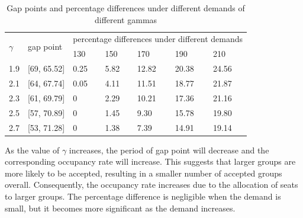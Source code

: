 \begin{table}[ht]
  \centering
  \caption{Gap points and percentage differences under different demands of different gammas}
\begin{tabular}{lllllll}
  \hline
  \multicolumn{1}{|l|}{\multirow{2}{*}{$\gamma$}} & \multicolumn{1}{l|}{\multirow{2}{*}{gap point}} & \multicolumn{5}{l|}{percentage differences under different demands}   \\ 
  \cline{3-7} 
  \multicolumn{1}{|l|}{}                      & \multicolumn{1}{l|}{}                    & \multicolumn{1}{l|}{130} & \multicolumn{1}{l|}{150} & \multicolumn{1}{l|}{170} & \multicolumn{1}{l|}{190} & \multicolumn{1}{l|}{210} \\ 
  \hline
  \multicolumn{1}{|l|}{1.9}  & \multicolumn{1}{l|}{[69, 65.52]}  & \multicolumn{1}{l|}{0.25}  & \multicolumn{1}{l|}{5.82}  & \multicolumn{1}{l|}{12.82} & \multicolumn{1}{l|}{20.38} & \multicolumn{1}{l|}{24.56} \\ 
  \hline                                    
  \multicolumn{1}{|l|}{2.1}  & \multicolumn{1}{l|}{[64, 67.74]}  & \multicolumn{1}{l|}{0.05}  & \multicolumn{1}{l|}{4.11}  & \multicolumn{1}{l|}{11.51} & \multicolumn{1}{l|}{18.77} & \multicolumn{1}{l|}{21.87} \\ 
  \hline           
  \multicolumn{1}{|l|}{2.3}  & \multicolumn{1}{l|}{[61, 69.79]}  & \multicolumn{1}{l|}{0}  & \multicolumn{1}{l|}{2.29}  & \multicolumn{1}{l|}{10.21} & \multicolumn{1}{l|}{17.36} & \multicolumn{1}{l|}{21.16} \\ 
  \hline           
  \multicolumn{1}{|l|}{2.5}  & \multicolumn{1}{l|}{[57, 70.89]}  & \multicolumn{1}{l|}{0}  & \multicolumn{1}{l|}{1.45}  & \multicolumn{1}{l|}{9.30} & \multicolumn{1}{l|}{15.78} & \multicolumn{1}{l|}{19.80} \\ 
  \hline          
  \multicolumn{1}{|l|}{2.7}  & \multicolumn{1}{l|}{[53, 71.28]}  & \multicolumn{1}{l|}{0}  & \multicolumn{1}{l|}{1.38}  & \multicolumn{1}{l|}{7.39} & \multicolumn{1}{l|}{14.91} & \multicolumn{1}{l|}{19.14} \\ 
  \hline            
\end{tabular}
\end{table}


As the value of $\gamma$ increases, the period of gap point will decrease and the corresponding occupancy rate will increase. This suggests that larger groups are more likely to be accepted, resulting in a smaller number of accepted groups overall. Consequently, the occupancy rate increases due to the allocation of seats to larger groups. The percentage difference is negligible when the demand is small, but it becomes more significant as the demand increases.


